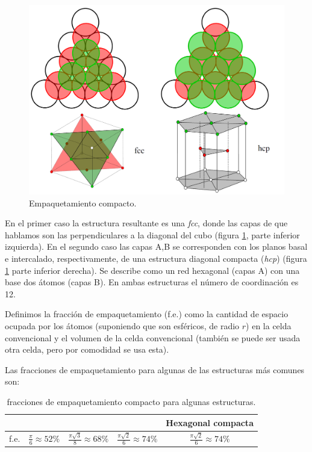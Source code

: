 \begin{figure}[h!] \centering
    \includegraphics[scale=0.2]{Cuerpo/Ch_01/Empaquetamiento_compacto.png}
    \caption{Empaquetamiento compacto.}
    \label{Fig:01-04}
\end{figure}

En el primer caso la estructura resultante es una {\it fcc}, donde las capas de que hablamos son las perpendiculares a la diagonal del cubo (figura \ref{Fig:01-04}, parte inferior izquierda). En el segundo caso las capas A,B se corresponden con los planos basal e intercalado, respectivamente, de una estructura diagonal compacta ({\it hcp}) (figura \ref{Fig:01-04} parte inferior derecha). Se describe como un red hexagonal (capas A) con una base dos átomos (capas B). En ambas estructuras el número de coordinación es 12. 

\begin{definition} Definimos la fracción de empaquetamiento (f.e.) como la cantidad de espacio ocupada por los átomos (suponiendo que son esféricos, de radio $r$) en la celda convencional y el volumen de la celda convencional (también se puede ser usada otra celda, pero por comodidad se usa esta).	
\end{definition}
Las fracciones de empaquetamiento para algunas de las estructuras más comunes son: 

\begin{table}[h!] \centering
	\begin{tabular}{c|c|c|c|c}
	 &	\sc  & \bcc & \fcc & Hexagonal compacta \\ \hline \vspace{0.5cm}
	 f.e. & $\frac{\pi}{6} \approx 52\%$ & $\frac{\pi \sqrt{3}}{8} \approx 68\%$ & $\frac{\pi \sqrt{2}}{6} \approx 74\%$ & $\frac{\pi \sqrt{2}}{6} \approx 74\%$ 
	\end{tabular}
	\caption{fracciones de empaquetamiento compacto para algunas estructuras.}
\end{table}


